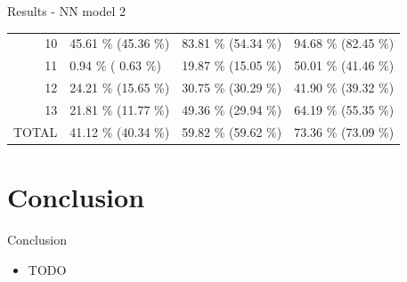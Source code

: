 \documentclass{beamer}
\begin{document}
\begin{darkframes}
\begin{frame}{Results - NN model 2}
\begin{table}[!b]
{\begin{tabularx}{\textwidth}{r|X|X|X}
10    & 45.61 \% {\color[HTML]{9B9B9B} (45.36 \%)} & 83.81 \% {\color[HTML]{9B9B9B} (54.34 \%)} & 94.68 \% {\color[HTML]{9B9B9B} (82.45 \%)} \\

11    & 0.94 \% {\color[HTML]{9B9B9B}( 0.63 \%)}  & 19.87 \% {\color[HTML]{9B9B9B} (15.05 \%)} & 50.01 \% {\color[HTML]{9B9B9B} (41.46 \%)} \\

12    & 24.21 \% {\color[HTML]{9B9B9B} (15.65 \%)} & 30.75 \% {\color[HTML]{9B9B9B} (30.29 \%)} & 41.90 \% {\color[HTML]{9B9B9B} (39.32 \%)} \\

13    & 21.81 \% {\color[HTML]{9B9B9B} (11.77 \%)} & 49.36 \% {\color[HTML]{9B9B9B} (29.94 \%)} & 64.19 \% {\color[HTML]{9B9B9B} (55.35 \%)} \\

\toprule
TOTAL & 41.12 \% {\color[HTML]{9B9B9B} (40.34 \%)} & 59.82 \% {\color[HTML]{9B9B9B} (59.62 \%)} & 73.36 \% {\color[HTML]{9B9B9B} (73.09 \%)} \\
\bottomrule
        \end{tabularx}}
      \end{table}
    \end{frame}

    \section{Conclusion}

    \begin{frame}{Conclusion}
      \begin{itemize}
        \item TODO
      \end{itemize}
    \end{frame}

  \end{darkframes}
\end{document}
